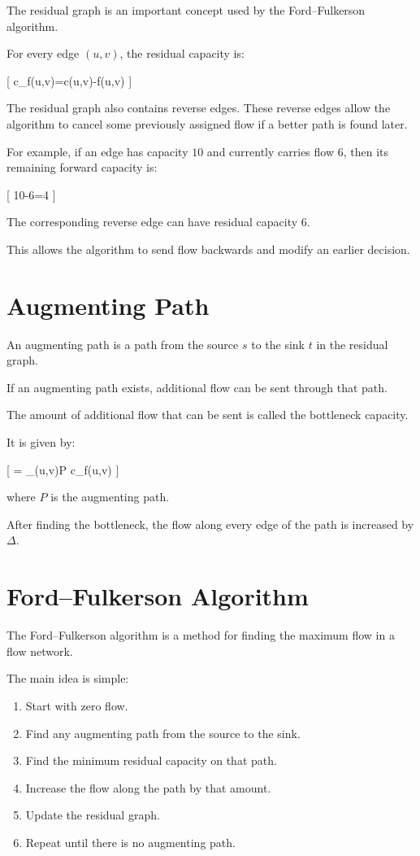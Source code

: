 \documentclass[12pt,a4paper]{article}
\begin{document}
The residual graph is an important concept used by the
Ford--Fulkerson algorithm.

For every edge $(u,v)$, the residual capacity is:

[
c_f(u,v)=c(u,v)-f(u,v)
]

The residual graph also contains reverse edges. These reverse edges
allow the algorithm to cancel some previously assigned flow if a
better path is found later.

For example, if an edge has capacity $10$ and currently carries flow
$6$, then its remaining forward capacity is:

[
10-6=4
]

The corresponding reverse edge can have residual capacity $6$.

This allows the algorithm to send flow backwards and modify an earlier
decision.

\section{Augmenting Path}

An augmenting path is a path from the source $s$ to the sink $t$ in the
residual graph.

If an augmenting path exists, additional flow can be sent through that
path.

The amount of additional flow that can be sent is called the
bottleneck capacity.

It is given by:

[
\Delta =
\min\_{(u,v)\in P} c_f(u,v)
]

where $P$ is the augmenting path.

After finding the bottleneck, the flow along every edge of the path is
increased by $\Delta$.

\section{Ford--Fulkerson Algorithm}

The Ford--Fulkerson algorithm is a method for finding the maximum flow
in a flow network.

The main idea is simple:

\begin{enumerate}
\item Start with zero flow.
\item Find any augmenting path from the source to the sink.
\item Find the minimum residual capacity on that path.
\item Increase the flow along the path by that amount.
\item Update the residual graph.
\item Repeat until there is no augmenting path.
\end{enumerate}
\end{document}
